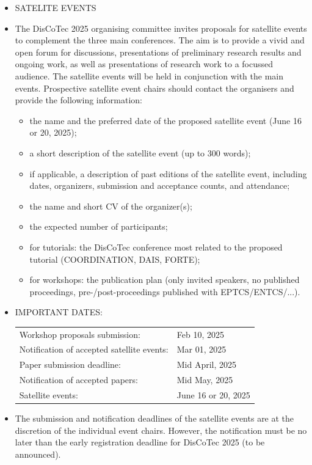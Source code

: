 \documentclass[prodmode,acmtecs]{acmsmall} %
\begin{document}
\begin{itemize}\item  SATELITE EVENTS 
 
\item  The DisCoTec 2025 organising committee invites proposals for satellite events to complement the three main conferences. The aim is to provide a vivid and open forum for discussions, presentations of preliminary research results and ongoing work, as well as presentations of research work to a focussed audience. The satellite events will be held in conjunction with the main events. Prospective satellite event chairs should contact the organisers and provide the following information: 
 
\begin{itemize}\item  the name and the preferred date of the proposed satellite event (June 16 or 20, 2025);
\item  a short description of the satellite event (up to 300 words);
\item  if applicable, a description of past editions of the satellite event, including dates, organizers, submission and acceptance counts, and attendance;
\item  the name and short CV of the organizer(s);
\item  the expected number of participants;
\item  for tutorials: the DisCoTec conference most related to the proposed tutorial (COORDINATION, DAIS, FORTE);
\item  for workshops: the publication plan (only invited speakers, no published proceedings, pre-/post-proceedings published with EPTCS/ENTCS/...).
\end{itemize} 
\item  IMPORTANT DATES:  
 
\begin{tabulary}{\linewidth}{LL}Workshop proposals submission:  & Feb 10, 2025 \\
Notification of accepted satellite events:  & Mar 01, 2025 \\
Paper submission deadline:  & Mid April, 2025 \\
Notification of accepted papers:  & Mid May, 2025 \\
Satellite events:  & June 16 or 20, 2025 \\
\end{tabulary}
 
\item  The submission and notification deadlines of the satellite events are at the discretion of the individual event chairs. However, the notification must be no later than the early registration deadline for DisCoTec 2025 (to be announced). 
 

\end{itemize}
\end{document}
